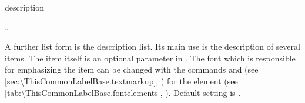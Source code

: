   \begin{Declaration}
    \begin{Environment}{description}
      \begin{Body}
         \dots
        \BodyDots
      \end{Body}
    \end{Environment}
  \end{Declaration}%
  A further list form is the description list. Its main use is the description
  of several items. The item itself is an optional parameter in
  . The font%
  which is responsible for emphasizing the item can be changed with the
  commands  and
   (see
  \autoref{sec:\ThisCommonLabelBase.textmarkup},
  ) for the element
   (see
  \autoref{tab:\ThisCommonLabelBase.fontelements},
  ). Default setting is
  \linebreak[1].%
